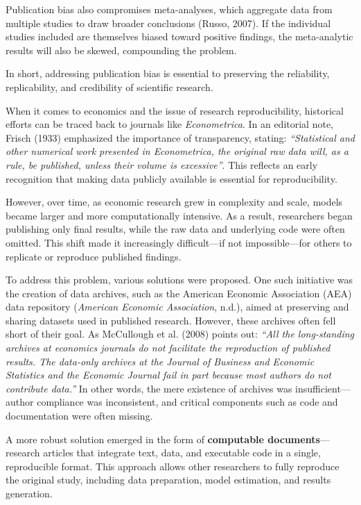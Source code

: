 \documentclass[
  british,
  a4paper,
]{article}
\begin{document}
Publication bias also compromises meta-analyses, which aggregate data
from multiple studies to draw broader conclusions (Russo, 2007). If the
individual studies included are themselves biased toward positive
findings, the meta-analytic results will also be skewed, compounding the
problem.

In short, addressing publication bias is essential to preserving the
reliability, replicability, and credibility of scientific research.

When it comes to economics and the issue of research reproducibility,
historical efforts can be traced back to journals like
\emph{Econometrica}. In an editorial note, Frisch (1933) emphasized the
importance of transparency, stating: \emph{``Statistical and other
numerical work presented in Econometrica, the original raw data will, as
a rule, be published, unless their volume is excessive''}. This reflects
an early recognition that making data publicly available is essential
for reproducibility.

However, over time, as economic research grew in complexity and scale,
models became larger and more computationally intensive. As a result,
researchers began publishing only final results, while the raw data and
underlying code were often omitted. This shift made it increasingly
difficult---if not impossible---for others to replicate or reproduce
published findings.

To address this problem, various solutions were proposed. One such
initiative was the creation of data archives, such as the American
Economic Association (AEA) data repository (\emph{American {Economic
Association}}, n.d.), aimed at preserving and sharing datasets used in
published research. However, these archives often fell short of their
goal. As McCullough et al. (2008) points out: \emph{``All the
long-standing archives at economics journals do not facilitate the
reproduction of published results. The data-only archives at the Journal
of Business and Economic Statistics and the Economic Journal fail in
part because most authors do not contribute data.''} In other words, the
mere existence of archives was insufficient---author compliance was
inconsistent, and critical components such as code and documentation
were often missing.

A more robust solution emerged in the form of \textbf{computable
documents}---research articles that integrate text, data, and executable
code in a single, reproducible format. This approach allows other
researchers to fully reproduce the original study, including data
preparation, model estimation, and results generation.
\end{document}

